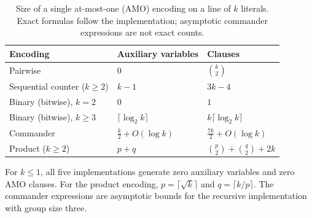 
\begin{table}[t]
\centering
\caption{Size of a single at-most-one (AMO) encoding on a line of $k$ literals.
Exact formulas follow the implementation; asymptotic commander expressions are not exact counts.}
\label{tab:amo-blocks}
\small
\begin{tabular}{@{}lll@{}}
\toprule
Encoding & Auxiliary variables & Clauses \\
\midrule
Pairwise
  & $0$
  & $\binom{k}{2}$ \\
Sequential counter ($k\ge 2$)
  & $k-1$
  & $3k-4$ \\
Binary (bitwise), $k=2$
  & $0$
  & $1$ \\
Binary (bitwise), $k\ge 3$
  & $\lceil\log_2 k\rceil$
  & $k\lceil\log_2 k\rceil$ \\
Commander
  & $\frac{k}{2}+O(\log k)$
  & $\frac{7k}{2}+O(\log k)$ \\
Product ($k\ge 2$)
  & $p+q$
  & $\binom{p}{2}+\binom{q}{2}+2k$ \\
\bottomrule
\end{tabular}

\vspace{2pt}
\begin{minipage}{0.96\linewidth}
\footnotesize
For $k\le 1$, all five implementations generate zero auxiliary variables and zero AMO clauses. For the product encoding, $p=\lceil\sqrt{k}\rceil$ and $q=\lceil k/p\rceil$. The commander expressions are asymptotic bounds for the recursive implementation with group size three.
\end{minipage}
\end{table}

